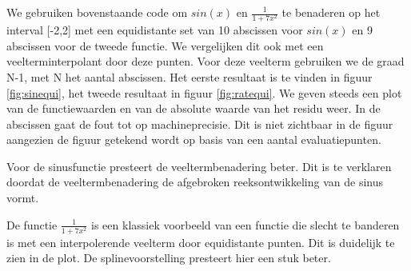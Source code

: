 We gebruiken bovenstaande code om $sin(x)$ en $\frac{1}{1+7x^2}$ te benaderen op het interval [-2,2] met een equidistante set van 10 abscissen voor $sin(x)$ en 9 abscissen voor de tweede functie. We vergelijken dit ook met een veelterminterpolant door deze punten. Voor deze veelterm gebruiken we de graad N-1, met N het aantal abscissen. Het eerste resultaat is te vinden in figuur \ref{fig:sinequi}, het tweede resultaat in figuur \ref{fig:ratequi}. We geven steeds een plot van de functiewaarden en van de absolute waarde van het residu weer. In de abscissen gaat de fout tot op machineprecisie. Dit is niet zichtbaar in de figuur aangezien de figuur getekend wordt op basis van een aantal evaluatiepunten.

Voor de sinusfunctie presteert de veeltermbenadering beter. Dit is te verklaren doordat de veeltermbenadering de afgebroken reeksontwikkeling van de sinus vormt.

De functie $\frac{1}{1+7x^2}$ is een klassiek voorbeeld van een functie die slecht te banderen is met een interpolerende veelterm door equidistante punten. Dit is duidelijk te zien in de plot. De splinevoorstelling presteert hier een stuk beter.

